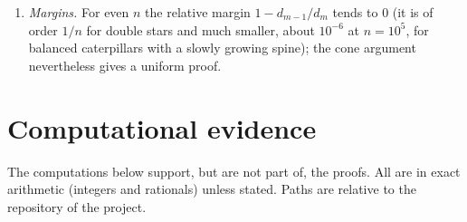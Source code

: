 \documentclass[11pt]{amsart}
\theoremstyle{definition}
\theoremstyle{remark}
\newcommand{\adj}{\operatorname{adj}}
\newcommand{\one}{\mathbf 1}
\newcommand{\T}{\mathsf T}
\begin{document}
\begin{enumerate}
$M=M(K,\nu)$ and $\Phi(K,\nu)$ as in Section~\ref{sec:minors},
$p^\nu=\one+x\tau-x\nu$ (so $p^\nu_v=1+(2-k_v-\nu_v)x$), and
\[
R(K,\nu)=(|\nu|+j-1)(1+x)\,\Phi(K,\nu)-p^{\nu\T}\adj(M)\,p^\nu ;
\]
for $\nu=we_u$ this is $R_w(K,u)$ of Section~\ref{sec:rooted}.
Theorem~\ref{thm:T5}(iii) with Remark~\ref{rem:Ccone} is the case
$\nu=e_u$ of the statement ``$R(K,\nu)\in\mathcal C_{j+1}$ for every
weighted tree with $\nu\ne0$'', which is open for general weights; some
stronger auxiliary statements of this kind are false (the project records
counterexamples on stars with heavy leaves).
\item \emph{Margins.} For even $n$ the relative margin $1-d_{m-1}/d_m$ tends
to $0$ (it is of order $1/n$ for double stars and much smaller, about
$10^{-6}$ at $n=10^5$, for balanced caterpillars with a slowly growing spine);
the cone argument nevertheless gives a uniform proof.
\end{enumerate}

\section{Computational evidence}\label{sec:comp}

The computations below support, but are not part of, the proofs. All are
in exact arithmetic (integers and rationals) unless stated. Paths are
relative to the repository of the project.
\end{document}
